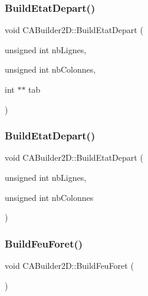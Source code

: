 \subsubsection{\texorpdfstring{Build\+Etat\+Depart()}{BuildEtatDepart()}\hspace{0.1cm}{\footnotesize\ttfamily [2/3]}}
{\footnotesize\ttfamily void C\+A\+Builder2\+D\+::\+Build\+Etat\+Depart (\begin{DoxyParamCaption}\item[{unsigned int}]{nb\+Lignes,  }\item[{unsigned int}]{nb\+Colonnes,  }\item[{int $\ast$$\ast$}]{tab }\end{DoxyParamCaption})\hspace{0.3cm}{\ttfamily [inline]}}

\mbox{\label{class_c_a_builder2_d_a7300ec839baa5de1d8c3b9a044b6c3cb}} 
\subsubsection{\texorpdfstring{Build\+Etat\+Depart()}{BuildEtatDepart()}\hspace{0.1cm}{\footnotesize\ttfamily [3/3]}}
{\footnotesize\ttfamily void C\+A\+Builder2\+D\+::\+Build\+Etat\+Depart (\begin{DoxyParamCaption}\item[{unsigned int}]{nb\+Lignes,  }\item[{unsigned int}]{nb\+Colonnes }\end{DoxyParamCaption})\hspace{0.3cm}{\ttfamily [inline]}}

\mbox{\label{class_c_a_builder2_d_a71f988b3a445b18248661fc4c890a3a0}} 
\subsubsection{\texorpdfstring{Build\+Feu\+Foret()}{BuildFeuForet()}}
{\footnotesize\ttfamily void C\+A\+Builder2\+D\+::\+Build\+Feu\+Foret (\begin{DoxyParamCaption}{ }\end{DoxyParamCaption})\hspace{0.3cm}{\ttfamily [inline]}}

